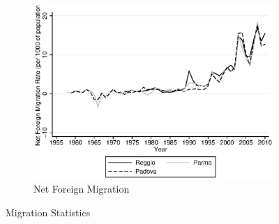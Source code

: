 \begin{figure}[H]
\begin{subfigure}[t]{0.48\textwidth}
          \includegraphics[width=\textwidth]{../../output/image/netforeignmig.eps} 
        \caption{Net Foreign Migration}        
        \end{subfigure}      
      
      \caption{Migration Statistics}  \label{fig:emigr-immigr}
    \end{figure}


